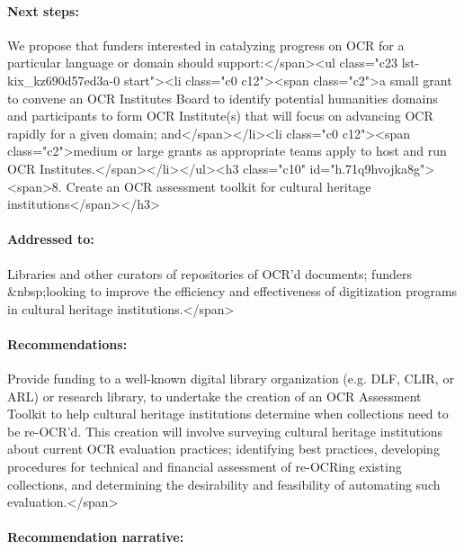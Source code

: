 \documentclass[twoside,11pt]{report}
\begin{document}
\paragraph{Next steps:} We propose that funders interested in catalyzing progress on OCR for a particular language or domain should support:</span><ul class="c23 lst-kix_kz690d57ed3a-0 start"><li class="c0 c12"><span class="c2">a small grant to convene an OCR Institutes Board to identify potential humanities domains and participants to form OCR Institute(s) that will focus on advancing OCR rapidly for a given domain; and</span></li><li class="c0 c12"><span class="c2">medium or large grants as appropriate teams apply to host and run OCR Institutes.</span></li></ul><h3 class="c10" id="h.71q9hvojka8g"><span>8. Create an OCR assessment toolkit for cultural heritage institutions</span></h3>

\paragraph{Addressed to:} Libraries and other curators of repositories of OCR'd documents; funders &nbsp;looking to improve the efficiency and effectiveness of digitization programs in cultural heritage institutions.</span>

\paragraph{Recommendations:} Provide funding to a well-known digital library organization (e.g. DLF, CLIR, or ARL) or research library, to undertake the creation of an OCR Assessment Toolkit to help cultural heritage institutions determine when collections need to be re-OCR'd. This creation will involve surveying cultural heritage institutions about current OCR evaluation practices; identifying best practices, developing procedures for technical and financial assessment of re-OCRing existing collections, and determining the desirability and feasibility of automating such evaluation.</span>

\paragraph{Recommendation narrative:}
\end{document}
